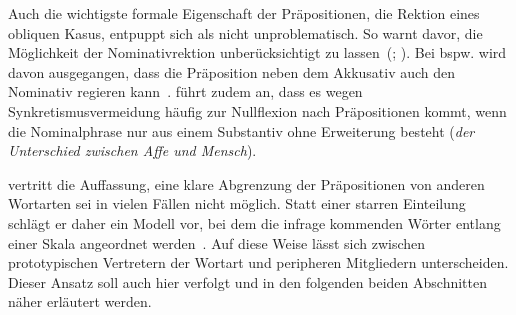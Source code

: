Auch die wichtigste formale Eigenschaft der Präpositionen, die Rektion eines obliquen Kasus, entpuppt sich als nicht unproblematisch. 
So warnt \citet[29]{Lindqvist1994} davor, die M{\"o}glichkeit der Nominativrektion unber{\"u}cksichtigt zu lassen~(\citealp[s. auch][134]{Eroms1981}; \citealp[695]{Engel1988}). 
Bei  bspw. wird davon ausgegangen, dass die Pr{\"a}position neben dem Akkusativ auch den Nominativ regieren kann~\citep[s.][291]{Hentschel1989}. 
\citet[291]{Hentschel1989} f{\"u}hrt zudem an, dass es wegen Synkretismusvermeidung h{\"a}ufig zur Nullflexion nach Pr{\"a}positionen kommt, wenn die Nominalphrase nur aus einem Substantiv ohne Erweiterung besteht (\textit{der Unterschied zwischen Affe und Mensch}). 

\citet{Lindqvist1994} vertritt die Auffassung, eine klare Abgrenzung der Pr{\"a}positionen von anderen Wortarten sei in vielen F{\"a}llen nicht m{\"o}glich.
Statt einer starren Einteilung schl{\"a}gt er daher ein Modell vor, bei dem die infrage kommenden W{\"o}rter entlang einer Skala angeordnet werden~\citep[s.][5]{Lindqvist1994}. 
Auf diese Weise lässt sich zwischen prototypischen Vertretern der Wortart und peripheren Mitgliedern unterscheiden. 
Dieser Ansatz soll auch hier verfolgt und in den folgenden beiden Abschnitten näher erläutert werden. 
